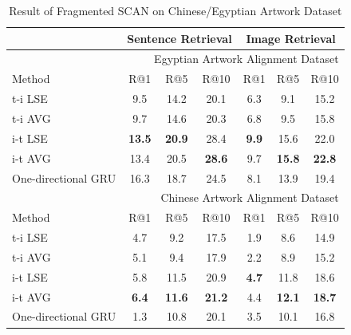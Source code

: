 \begin{table}[h!]
\centering
\begin{tabular}{lcccccc}
\hline
\hline
\multicolumn{1}{c}{} & \multicolumn{3}{c}{Sentence Retrieval} & \multicolumn{3}{c}{Image Retrieval} \\ \hline\hline
\multicolumn{7}{r}{Egyptian Artwork Alignment Dataset}                                              \\ \hline
Method               & R@1         & R@5         & R@10       & R@1        & R@5        & R@10      \\ \hline
t-i LSE              & 9.5        & 14.2        & 20.1       & 6.3       & 9.1       & 15.2      \\ \hline
t-i AVG              & 9.7        & 14.6        & 20.3       & 6.8       & 9.5       & 15.8      \\ \hline
i-t LSE              & \textbf{13.5}        & \textbf{20.9}        & 28.4       & \textbf{9.9}       & 15.6       & 22.0      \\ \hline
i-t AVG              & 13.4        & 20.5        & \textbf{28.6}       & 9.7       & \textbf{15.8}       & \textbf{22.8}      \\ \hline
One-directional GRU  & 16.3        & 18.7        & 24.5       & 8.1       & 13.9       & 19.4      \\ \hline\hline
\multicolumn{7}{r}{Chinese Artwork Alignment Dataset}                                               \\ \hline
Method               & R@1         & R@5         & R@10       & R@1        & R@5        & R@10      \\ \hline
t-i LSE              & 4.7         & 9.2        & 17.5       & 1.9        & 8.6       & 14.9      \\ \hline
t-i AVG              & 5.1         & 9.4        & 17.9       & 2.2        & 8.9       & 15.2      \\ \hline
i-t LSE              & 5.8         & 11.5        & 20.9       & \textbf{4.7}        & 11.8       & 18.6      \\ \hline
i-t AVG              & \textbf{6.4}         & \textbf{11.6}        & \textbf{21.2}       & 4.4        & \textbf{12.1}       & \textbf{18.7}      \\ \hline
One-directional GRU  & 1.3         & 10.8        & 20.1       & 3.5        & 10.1       & 16.8      \\ \hline
\end{tabular}
\caption{Result of Fragmented SCAN on Chinese/Egyptian Artwork Dataset}
\label{table:resultfragmented}
\end{table}



